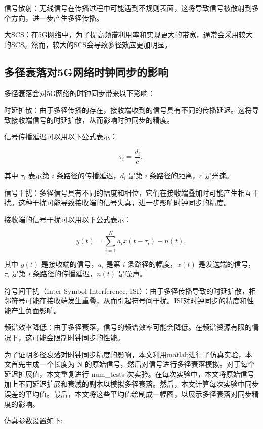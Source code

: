 \documentclass[UTF8,a4paper,12pt]{ctexart}
\numberwithin{equation}{section}
\begin{document}
	信号散射：无线信号在传播过程中可能遇到不规则表面，这将导致信号被散射到多个方向，进一步产生多径传播。
	
	大SCS：在5G网络中，为了提高频谱利用率和实现更大的带宽，通常会采用较大的SCS。然而，较大的SCS会导致多径效应更加明显。
	
	\subsection{多径衰落对5G网络时钟同步的影响}
	
	多径衰落会对5G网络的时钟同步带来以下影响：
	
	时延扩散：由于多径传播的存在，接收端收到的信号具有不同的传播延迟。这将导致接收端信号的时延扩散，从而影响时钟同步的精度。
	
	信号传播延迟可以用以下公式表示：
	
	\begin{equation}
		\tau_i = \frac{d_i}{c},
	\end{equation}
	
	其中 $\tau_i$ 表示第 $i$ 条路径的传播延迟，$d_i$ 是第 $i$ 条路径的距离，$c$ 是光速。
	
	信号干扰：多径信号具有不同的幅度和相位，它们在接收端叠加时可能产生相互干扰。这种干扰可能导致接收端的信号失真，进一步影响时钟同步的精度。
	
	接收端的信号干扰可以用以下公式表示：
	
	\begin{equation}
		y(t) = \sum_{i=1}^{N} a_i x(t - \tau_i) + n(t),
	\end{equation}
	
	其中 $y(t)$ 是接收端的信号，$a_i$ 是第 $i$ 条路径的幅度，$x(t)$ 是发送端的信号，$\tau_i$ 是第 $i$ 条路径的传播延迟，$n(t)$ 是噪声。
	
	符号间干扰（Inter Symbol Interference, ISI）：由于多径传播导致的时延扩散，相邻符号可能在接收端发生重叠，从而引起符号间干扰。ISI对时钟同步的精度和性能产生负面影响。
	
	频谱效率降低：由于多径衰落，信号的频谱效率可能会降低。在频谱资源有限的情况下，这可能会限制时钟同步的性能。
	
	为了证明多径衰落对时钟同步精度的影响，本文利用matlab进行了仿真实验，本文首先生成一个长度为 N 的原始信号，然后对信号进行多径衰落模拟。对于每个延迟扩展值，本文重复进行 num\_tests 次实验。在每次实验中，本文将原始信号加上不同延迟扩展和衰减的副本以模拟多径衰落。然后，本文计算每次实验中同步误差的平均值。最后，本文将这些平均值绘制成一幅图，以展示多径衰落对同步精度的影响。
	
	仿真参数设置如下:
	
\end{document}
